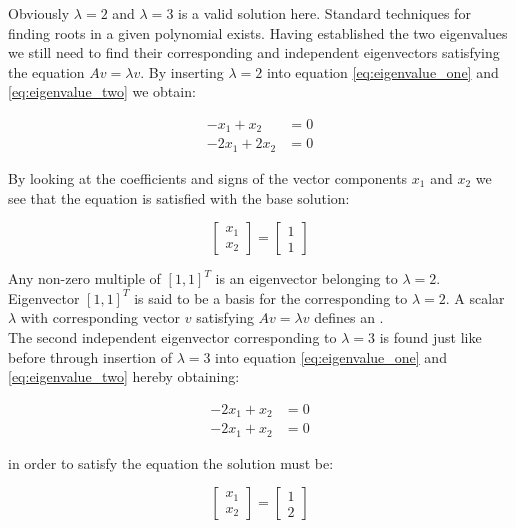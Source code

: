 Obviously $\lambda = 2$ and $\lambda = 3$ is a valid solution here.
Standard techniques for finding roots in a given
polynomial exists. Having established the two eigenvalues we still need to find their
corresponding and independent eigenvectors satisfying the equation $A
v = \lambda v$. By inserting $\lambda = 2$ into equation
\eqref{eq:eigenvalue_one} and \eqref{eq:eigenvalue_two} we obtain:

\begin{align}
-x_1 + x_2 & = 0 \\
-2x_1 + 2x_2 & = 0
\end{align}

By looking at the coefficients and signs of the vector components $x_1$
and $x_2$ we see that the equation is satisfied with the base solution:

\begin{equation}
\begin{bmatrix}
x_1 \\ x_2
\end{bmatrix}
=
\begin{bmatrix}
1 \\ 1
\end{bmatrix}
\end{equation}

Any non-zero multiple of $[1,1]^T$ is an eigenvector belonging to
$\lambda = 2$. Eigenvector $[1,1]^T$ is said to be a basis for the
 corresponding to $\lambda = 2$.
A scalar $\lambda$ with corresponding vector $v$ satisfying 
$A v = \lambda v$ defines an . \\ 

The second independent eigenvector corresponding to $\lambda = 3$ is
found just like before through insertion of $\lambda = 3$ into equation
\eqref{eq:eigenvalue_one} and \eqref{eq:eigenvalue_two} hereby obtaining:

\begin{align}
\label{eq:eigenvalue_one_reduced}
-2x_1 + x_2 & = 0 \\
\label{eq:eigenvalue_two_reduces}
-2x_1 + x_2 & = 0
\end{align}

in order to satisfy the equation the solution must be:

\begin{equation}
\begin{bmatrix}
x_1 \\ x_2
\end{bmatrix}
=
\begin{bmatrix}
1 \\ 2
\end{bmatrix}
\end{equation}


